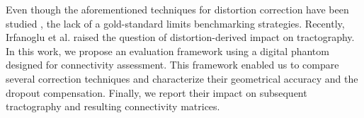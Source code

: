 Even though the aforementioned techniques for distortion correction
have been studied \cite{zeng_image_2002,wu_comparison_2008},
the lack of a gold-standard limits benchmarking 
strategies. Recently, Irfanoglu et al.
\cite{irfanoglu_effects_2012} raised the question
of distortion-derived impact on tractography.
In this work, we propose an evaluation framework
using a digital phantom designed for connectivity assessment.
This framework enabled us to compare several correction 
techniques and characterize their geometrical accuracy 
and the dropout compensation. Finally, we report their 
impact on subsequent tractography and resulting connectivity
matrices.